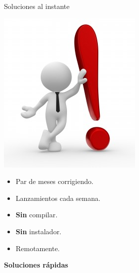 \begin{frame}{Soluciones al instante}
  \begin{center}
    \includegraphics[scale=0.3]{img/ed_presenting}
  \end{center}

  \begin{itemize}
    \item Par de meses corrigiendo.
    \item Lanzamientos cada semana.
    \item \textbf{Sin} compilar.
    \item \textbf{Sin} instalador.
    \item Remotamente.
  \end{itemize} \pause

  \begin{center}
    \textbf{Soluciones rápidas}
  \end{center}
\end{frame}

